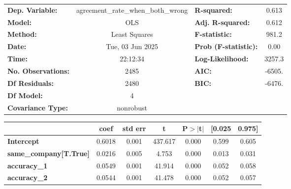 \begin{center}
\begin{tabular}{lclc}
\toprule
\textbf{Dep. Variable:}          & agreement\_rate\_when\_both\_wrong & \textbf{  R-squared:         } &     0.613   \\
\textbf{Model:}                  &                OLS                 & \textbf{  Adj. R-squared:    } &     0.612   \\
\textbf{Method:}                 &           Least Squares            & \textbf{  F-statistic:       } &     981.2   \\
\textbf{Date:}                   &          Tue, 03 Jun 2025          & \textbf{  Prob (F-statistic):} &     0.00    \\
\textbf{Time:}                   &              22:12:34              & \textbf{  Log-Likelihood:    } &    3257.3   \\
\textbf{No. Observations:}       &                 2485               & \textbf{  AIC:               } &    -6505.   \\
\textbf{Df Residuals:}           &                 2480               & \textbf{  BIC:               } &    -6476.   \\
\textbf{Df Model:}               &                    4               & \textbf{                     } &             \\
\textbf{Covariance Type:}        &             nonrobust              & \textbf{                     } &             \\
\bottomrule
\end{tabular}
\begin{tabular}{lcccccc}
                                 & \textbf{coef} & \textbf{std err} & \textbf{t} & \textbf{P$> |$t$|$} & \textbf{[0.025} & \textbf{0.975]}  \\
\midrule
\textbf{Intercept}               &       0.6018  &        0.001     &   437.617  &         0.000        &        0.599    &        0.605     \\
\textbf{same\_company[T.True]}   &       0.0216  &        0.005     &     4.753  &         0.000        &        0.013    &        0.031     \\
\textbf{accuracy\_1}             &       0.0549  &        0.001     &    41.914  &         0.000        &        0.052    &        0.058     \\
\textbf{accuracy\_2}             &       0.0544  &        0.001     &    41.478  &         0.000        &        0.052    &        0.057     \\

\end{tabular}
\end{center}
